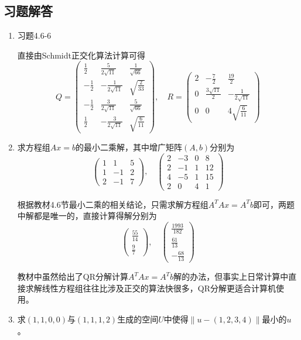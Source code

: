 \documentclass[a4paper,UTF8,fontset=windows]{ctexart}
\newcommand*{\note}{\noindent *}
\begin{document}
\subsection{习题解答}
\begin{enumerate}
    \item 习题4.6-6
    
    直接由Schmidt正交化算法计算可得
    $$Q=\begin{pmatrix}\frac{1}{2}&\frac{5}{2\sqrt{11}}&\frac{1}{\sqrt{66}}\\-\frac{1}{2}&-\frac{1}{2\sqrt{11}}&\sqrt{\frac{2}{33}}\\-\frac{1}{2}&\frac{3}{2\sqrt{11}}&\frac{5}{\sqrt{66}}\\\frac{1}{2}&-\frac{3}{2\sqrt{11}}&\sqrt{\frac{6}{11}}\end{pmatrix},\quad R=\begin{pmatrix}2&-\frac{7}{2}&\frac{19}{2}\\0&\frac{3\sqrt{11}}{2}&-\frac{1}{2\sqrt{11}}\\0&0&4\sqrt{\frac{6}{11}}\end{pmatrix}$$

    \item 求方程组$Ax=b$的最小二乘解，其中增广矩阵$(A,b)$分别为
    $$\begin{pmatrix}1&1&5\\1&-1&2\\2&-1&7\end{pmatrix},\quad\begin{pmatrix}2&-3&0&8\\2&-1&1&12\\4&-5&1&15\\2&0&4&1\end{pmatrix}$$

    根据教材4.6节最小二乘的相关结论，只需求解方程组$A^TAx=A^Tb$即可，两题中解都是唯一的，直接计算得解分别为
    $$\begin{pmatrix}\frac{55}{14}\\\frac{9}{7}\end{pmatrix},\quad\begin{pmatrix}\frac{1993}{182}\\\frac{61}{13}\\-\frac{68}{13}\end{pmatrix}$$

    \note 教材中虽然给出了QR分解计算$A^TAx=A^Tb$解的办法，但事实上日常计算中直接求解线性方程组往往比涉及正交的算法快很多，QR分解更适合计算机使用。

    \item 求$(1,1,0,0)$与$(1,1,1,2)$生成的空间$U$中使得$\|u-(1,2,3,4)\|$最小的$u$。
    

\end{enumerate}
\end{document}
